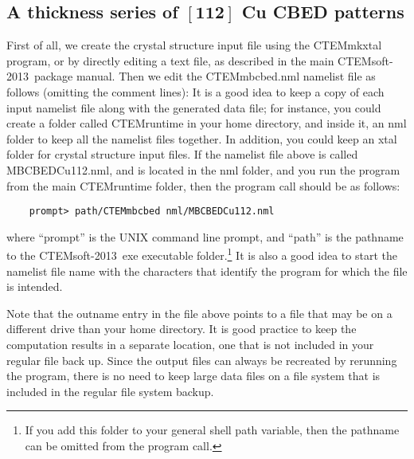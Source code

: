 \documentclass[DIV=calc, paper=letter, fontsize=11pt]{scrartcl}	 %
\newcommand{\ctp}{\textsf{CTEMsoft-2013}}
\begin{document}
\subsection{A thickness series of $\mathbf{[112]}$ Cu CBED patterns\label{sec:example1}}
First of all, we create the crystal structure input file using the \textsf{CTEMmkxtal} program, or by directly editing a 
text file, as described in the main \ctp\ package manual.  Then we edit the \textsf{CTEMmbcbed.nml} namelist file as follows (omitting the comment lines):
It is a good idea to keep a copy of each input namelist file along with the generated data file;  for instance, you could create 
a folder called \textsf{CTEMruntime} in your home directory, and inside it, an \textsf{nml} folder to keep all the namelist files
together.  In addition, you could keep an \textsf{xtal} folder for crystal structure input files.  If the namelist file above is called
\textsf{MBCBEDCu112.nml}, and is located in the \textsf{nml} folder, and you run the program from the main \textsf{CTEMruntime}
folder, then the program call should be as follows:
\begin{verbatim}
	prompt> path/CTEMmbcbed nml/MBCBEDCu112.nml
\end{verbatim}
where ``prompt'' is the UNIX command line prompt, and ``path'' is the pathname to the \ctp\ \textsf{exe} executable folder.\footnote{If you
add this folder to your general shell path variable, then the pathname can be omitted from the program call.}  It is also a good idea to 
start the namelist file name with the characters that identify the program for which the file is intended.

Note that the \textsf{outname} entry in the file above points to a file that may be on a different drive than your home directory.  It is
good practice to keep the computation results in a separate location, one that is not included in your regular file back up.  Since the 
output files can always be recreated by rerunning the program, there is no need to keep large data files on a file system that is included in
the regular file system backup.
\end{document}

